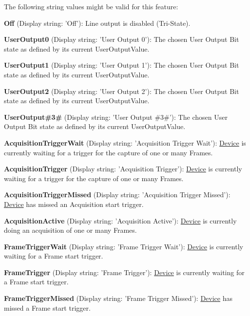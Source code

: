 The following string values might be valid for this feature\+:
\begin{DoxyItemize}
\item {\bfseries Off} (Display string\+: 'Off')\+: Line output is disabled (Tri-\/\+State).
\item {\bfseries User\+Output0} (Display string\+: 'User Output 0')\+: The chosen User Output Bit state as defined by its current User\+Output\+Value.
\item {\bfseries User\+Output1} (Display string\+: 'User Output 1')\+: The chosen User Output Bit state as defined by its current User\+Output\+Value.
\item {\bfseries User\+Output2} (Display string\+: 'User Output 2')\+: The chosen User Output Bit state as defined by its current User\+Output\+Value.
\item {\bfseries User\+Output\#3\#} (Display string\+: 'User Output \#3\#')\+: The chosen User Output Bit state as defined by its current User\+Output\+Value.
\item {\bfseries Acquisition\+Trigger\+Wait} (Display string\+: 'Acquisition Trigger Wait')\+: \hyperlink{classmv_i_m_p_a_c_t_1_1acquire_1_1_device}{Device} is currently waiting for a trigger for the capture of one or many Frames.
\item {\bfseries Acquisition\+Trigger} (Display string\+: 'Acquisition Trigger')\+: \hyperlink{classmv_i_m_p_a_c_t_1_1acquire_1_1_device}{Device} is currently waiting for a trigger for the capture of one or many Frames.
\item {\bfseries Acquisition\+Trigger\+Missed} (Display string\+: 'Acquisition Trigger Missed')\+: \hyperlink{classmv_i_m_p_a_c_t_1_1acquire_1_1_device}{Device} has missed an Acquisition start trigger.
\item {\bfseries Acquisition\+Active} (Display string\+: 'Acquisition Active')\+: \hyperlink{classmv_i_m_p_a_c_t_1_1acquire_1_1_device}{Device} is currently doing an acquisition of one or many Frames.
\item {\bfseries Frame\+Trigger\+Wait} (Display string\+: 'Frame Trigger Wait')\+: \hyperlink{classmv_i_m_p_a_c_t_1_1acquire_1_1_device}{Device} is currently waiting for a Frame start trigger.
\item {\bfseries Frame\+Trigger} (Display string\+: 'Frame Trigger')\+: \hyperlink{classmv_i_m_p_a_c_t_1_1acquire_1_1_device}{Device} is currently waiting for a Frame start trigger.
\item {\bfseries Frame\+Trigger\+Missed} (Display string\+: 'Frame Trigger Missed')\+: \hyperlink{classmv_i_m_p_a_c_t_1_1acquire_1_1_device}{Device} has missed a Frame start trigger.

\end{DoxyItemize}
